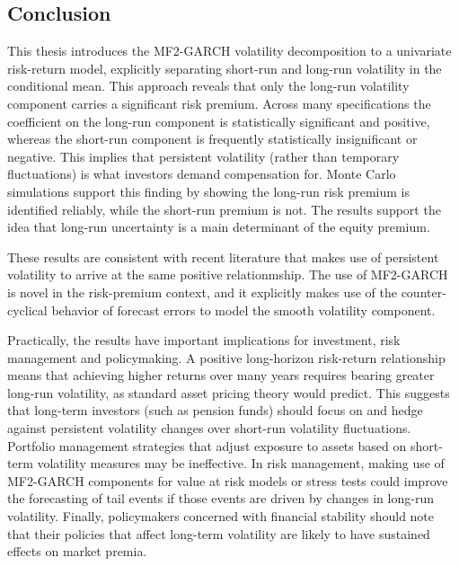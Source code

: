 \documentclass[12pt]{article}
\begin{document}
\subsection{Conclusion}
This thesis introduces the MF2-GARCH volatility decomposition to a univariate risk-return model, explicitly separating short-run and long-run volatility in the conditional mean. This approach reveals that only the long-run volatility component carries a significant risk premium. Across many specifications the coefficient on the long-run component is statistically significant and positive, whereas the short-run component is frequently statistically insignificant or negative. This implies that persistent volatility (rather than temporary fluctuations) is what investors demand compensation for. Monte Carlo simulations support this finding by showing the long-run risk premium is identified reliably, while the short-run premium is not. The results support the idea that long-run uncertainty is a main determinant of the equity premium.\par
These results are consistent with recent literature that makes use of persistent volatility to arrive at the same positive relationmship. The use of MF2-GARCH is novel in the risk-premium context, and it explicitly makes use of the counter-cyclical behavior of forecast errors to model the smooth volatility component.\par
Practically, the results have important implications for investment, risk management and policymaking. A positive long-horizon risk-return relationship means that achieving higher returns over many years requires bearing greater long-run volatility, as standard asset pricing theory would predict. This suggests that long-term investors (such as pension funds) should focus on and hedge against persistent volatility changes over short-run volatility fluctuations. Portfolio management strategies that adjust exposure to assets based on short-term volatility measures may be ineffective. In risk management, making use of MF2-GARCH components for value at risk models or stress tests could improve the forecasting of tail events if those events are driven by changes in long-run volatility. Finally, policymakers concerned with financial stability should note that their policies that affect long-term volatility are likely to have sustained effects on market premia.\par
\end{document}
